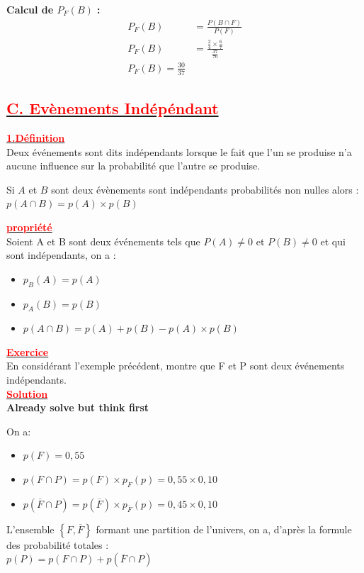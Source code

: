 \documentclass[12pt,a4paper]{article}
\newcounter{exemple}
\begin{document}
\vspace{1em}

\textbf{Calcul de $P_F(B)$ :}
\begin{align*}
P_F(B) &= \frac{P(B \cap F)}{P(F)} \\
P_F(B) &= \frac{\frac{2}{4} \times \frac{6}{7}}{\frac{37}{70}} \\
\boxed{P_F(B) = \frac{30}{37}}
\end{align*}

\subsection*{\underline{\textbf{\textcolor{red}{C. Evènements Indépéndant}}}}
\underline{\textbf{\textcolor{red}{1.Définition}}}\\
Deux événements sont dits indépendants lorsque le fait que l’un se produise n’a aucune influence sur la probabilité que l’autre se produise.

Si $A$ et $B$ sont deux évènements sont indépendants probabilités non nulles alors :
$p(A\cap B)=p(A)\times p(B)$

\underline{\textbf{\textcolor{red}{propriété}}}\\

Soient A et B sont deux événements tels que $P(A) \neq 0 $ et $P(B) \neq 0 $ et qui sont indépendants, on a :

\begin{itemize}
\item $p_{B}(A)=p(A)$
\item $p_{A}(B)=p(B)$
\item $p(A\cap B)=p(A) + p(B)-p(A)\times p(B)$
\end{itemize}

\underline{\textbf{\textcolor{red}{Exercice}}}\\
En considérant l'exemple précédent, montre que F et P sont deux événements indépendants.\\
\underline{\textbf{\textcolor{red}{Solution}}}\\
\textbf{Already solve but think first}

On a:
\begin{itemize}
\item[•]$p(F)=0,55$
\item[•] $p(F\cap P)=p(F)\times p_{F}(p)=0,55\times 0,10 $
\item[•] $p(\overline{F}\cap P)=p(\overline{F})\times p_{\overline{F}}(p)=0,45\times 0,10$
\end{itemize}
L'ensemble $\left\lbrace F, \overline{F} \right\rbrace $ formant une partition de l'univers, on a, d'après la formule des probabilité totales :\\
$p(P)=p(F\cap P)+p(\overline{F}\cap P)$
\end{document}
